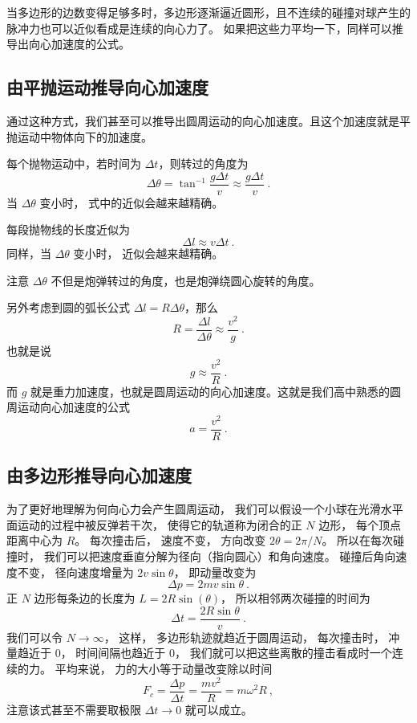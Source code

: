 当多边形的边数变得足够多时，多边形逐渐逼近圆形，且不连续的碰撞对球产生的脉冲力也可以近似看成是连续的向心力了。 如果把这些力平均一下，同样可以推导出向心加速度的公式。


\subsection{由平抛运动推导向心加速度}
通过这种方式，我们甚至可以推导出圆周运动的向心加速度。且这个加速度就是平抛运动中物体向下的加速度。

每个抛物运动中，若时间为 $\Delta t$，则转过的角度为
\begin{equation}
\Delta\theta = \tan^{-1}\frac{g\Delta t}{v} \approx \frac{g\Delta t}{v}~.
\end{equation}
当 $\Delta\theta$ 变小时， 式中的近似会越来越精确。

每段抛物线的长度近似为
\begin{equation}
\Delta l \approx v \Delta t~.
\end{equation}
同样，当 $\Delta\theta$ 变小时， 近似会越来越精确。

注意 $\Delta\theta$ 不但是炮弹转过的角度，也是炮弹绕圆心旋转的角度。

另外考虑到圆的弧长公式 $\Delta l = R\Delta\theta$，那么
\begin{equation}
R = \frac{\Delta l}{\Delta\theta} \approx \frac{v^2}{g}~.
\end{equation}
也就是说
\begin{equation}
g \approx \frac{v^2}{R}~.
\end{equation}
而 $g$ 就是重力加速度，也就是圆周运动的向心加速度。这就是我们高中熟悉的圆周运动向心加速度的公式
\begin{equation}
a = \frac{v^2}{R}~.
\end{equation}

\subsection{由多边形推导向心加速度}
为了更好地理解为何向心力会产生圆周运动， 我们可以假设一个小球在光滑水平面运动的过程中被反弹若干次， 使得它的轨道称为闭合的正 $N$ 边形， 每个顶点距离中心为 $R$。 每次撞击后， 速度不变， 方向改变 $2\theta  = 2\pi/N$。
所以在每次碰撞时， 我们可以把速度垂直分解为径向（指向圆心）和角向速度。 碰撞后角向速度不变， 径向速度增量为 $2v\sin\theta$， 即动量改变为
\begin{equation}
\Delta p = 2mv\sin\theta~.
\end{equation}
正 $N$ 边形每条边的长度为 $L = 2R\sin(\theta)$， 所以相邻两次碰撞的时间为
\begin{equation}
\Delta t = \frac{2R\sin\theta}{v}~.
\end{equation}
我们可以令 $N \to \infty$， 这样， 多边形轨迹就趋近于圆周运动， 每次撞击时， 冲量趋近于 0， 时间间隔也趋近于 0， 我们就可以把这些离散的撞击看成时一个连续的力。 平均来说， 力的大小等于动量改变除以时间
\begin{equation}
F_c = \frac{\Delta p}{\Delta t} = \frac{mv^2}{R} = m\omega^2 R~,
\end{equation}
注意该式甚至不需要取极限 $\Delta t \to 0$ 就可以成立。
